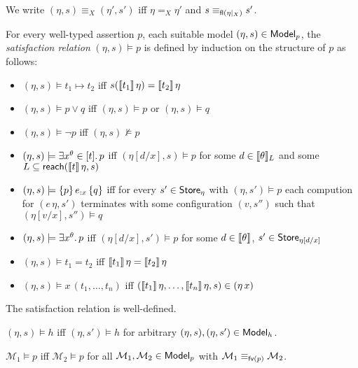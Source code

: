 \documentclass[12pt,a4paper]{report}
\begin{document}
We write $(\eta,s) \equiv_X (\eta',s')$ iff $\eta =_X \eta'$ and $s \equiv_{\mathsf{fl}(\eta|_X)} s'$.

\begin{definition}
  For every well-typed assertion $p$, each suitable model $(\eta,s) \in \mathsf{Model}_p$, the {\em satisfaction relation}
  $(\eta,s) \models p$ is defined by induction on the structure of $p$ as follows:
  \begin{itemize}
    \item $(\eta,s) \models t_1 \mapsto t_2$ iff $s(\llbracket t_1\rrbracket\,\eta) = \llbracket t_2\rrbracket\,\eta$
    \item $(\eta,s) \models p \vee q$ iff $(\eta,s) \models p$ or $(\eta,s) \models q$
    \item $(\eta,s) \models \neg p$ iff $(\eta,s) \not\models p$
    \item $(\eta,s) \models \exists{x^\theta}\in{[t]}.\,{p}$ iff $(\eta[d/x],s) \models p$ for some
          $d \in \llbracket\theta\rrbracket_L$ and some $L \subseteq \mathsf{reach}(\llbracket t\rrbracket\,\eta,s)$
    \item $(\eta,s) \models \{p\}\,e_{:x}\,\{q\}$ iff for every $s' \in \mathsf{Store}_{\eta}$ with
          $(\eta,s') \models p$ each compution for $(e\,\eta,s')$ terminates with some
          configuration $(v,s'')$ such that $(\eta[v/x],s'')\models q$
    \item $(\eta,s) \models \exists{x^\theta}.\,{p}$ iff $(\eta[d/x],s') \models p$ for some $d \in \llbracket\theta\rrbracket$,
          $s' \in \mathsf{Store}_{\eta[d/x]}$
    \item $(\eta,s) \models t_1 = t_2$ iff $\llbracket t_1\rrbracket\,\eta = \llbracket t_2\rrbracket\,\eta$
    \item $(\eta,s) \models x\,(t_1,\ldots,t_n)$ iff $(\llbracket t_1\rrbracket\,\eta,\ldots,\llbracket t_n\rrbracket\,\eta,s)\in (\eta\,x)$
  \end{itemize}
\end{definition}

\begin{lemma}
  The satisfaction relation is well-defined.
\end{lemma}

\begin{lemma}
  $(\eta,s) \models h$ iff $(\eta,s') \models h$ for arbitrary $(\eta,s),(\eta,s')\in\mathsf{Model}_h$.
\end{lemma}

\begin{lemma}[Coincidence]
  $\mathcal{M}_1 \models p$ iff $\mathcal{M}_2 \models p$ for all $\mathcal{M}_1,\mathcal{M}_2\in\mathsf{Model}_p$
  with $\mathcal{M}_1 \equiv_{\mathsf{fv}(p)} \mathcal{M}_2$.
\end{lemma}
\end{document}
